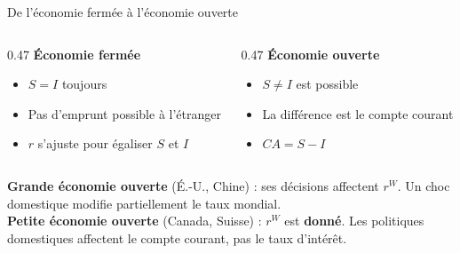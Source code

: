 \documentclass[aspectratio=169]{beamer}
\begin{document}
\begin{frame}[t]{De l'économie fermée à l'économie ouverte}
   \small
   \vspace{0.1cm}
   \begin{columns}[T]
      \begin{column}{0.47\textwidth}
         \textbf{\textcolor{HECgray}{Économie fermée}}
         \vspace{0.2cm}
         \begin{itemize}
            \setlength\itemsep{0.2cm}
            \item $S = I$ toujours
            \item Pas d'emprunt possible à l'étranger
            \item $r$ s'ajuste pour égaliser $S$ et $I$
         \end{itemize}
      \end{column}
      \begin{column}{0.47\textwidth}
         \textbf{\textcolor{HECnavy}{Économie ouverte}}
         \vspace{0.2cm}
         \begin{itemize}
            \setlength\itemsep{0.2cm}
            \item $S \neq I$ est possible
            \item La différence est le compte courant
            \item $CA = S - I$
         \end{itemize}
      \end{column}
   \end{columns}
   \vspace{0.3cm}
   \begin{defbox}
      \footnotesize
      \textbf{Grande économie ouverte} (É.-U., Chine) : ses décisions affectent $r^W$. Un choc domestique modifie partiellement le taux mondial.\\[4pt]
      \textbf{Petite économie ouverte} (Canada, Suisse) : $r^W$ est \textbf{donné}. Les politiques domestiques affectent le compte courant, pas le taux d'intérêt.
   \end{defbox}
\end{frame}
\end{document}
